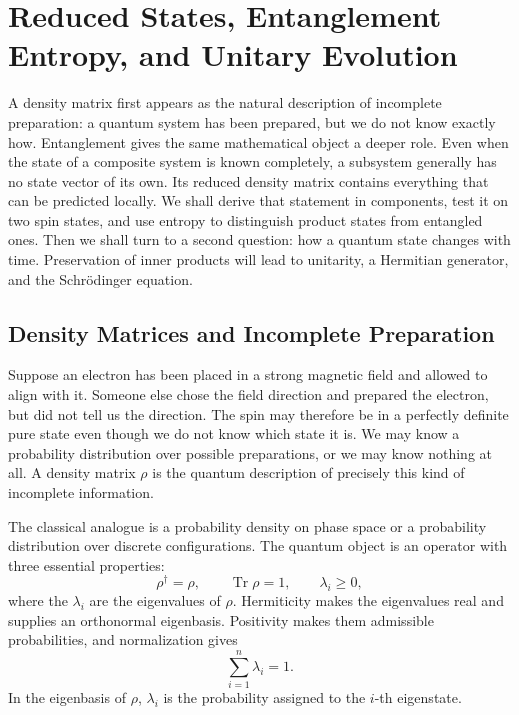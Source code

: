\chapter{Reduced States, Entanglement Entropy, and Unitary Evolution}

A density matrix first appears as the natural description of incomplete preparation: a quantum system has been prepared, but we do not know exactly how. Entanglement gives the same mathematical object a deeper role. Even when the state of a composite system is known completely, a subsystem generally has no state vector of its own. Its reduced density matrix contains everything that can be predicted locally. We shall derive that statement in components, test it on two spin states, and use entropy to distinguish product states from entangled ones. Then we shall turn to a second question: how a quantum state changes with time. Preservation of inner products will lead to unitarity, a Hermitian generator, and the Schr\"odinger equation.

\section{Density Matrices and Incomplete Preparation}

Suppose an electron has been placed in a strong magnetic field and allowed to align with it. Someone else chose the field direction and prepared the electron, but did not tell us the direction. The spin may therefore be in a perfectly definite pure state even though we do not know which state it is. We may know a probability distribution over possible preparations, or we may know nothing at all. A density matrix \(\rho\) is the quantum description of precisely this kind of incomplete information.

The classical analogue is a probability density on phase space or a probability distribution over discrete configurations. The quantum object is an operator with three essential properties:
\begin{equation}
\rho^\dagger=\rho,
\qquad
\operatorname{Tr}\rho=1,
\qquad
\lambda_i\geq 0,
\end{equation}
where the \(\lambda_i\) are the eigenvalues of \(\rho\). Hermiticity makes the eigenvalues real and supplies an orthonormal eigenbasis. Positivity makes them admissible probabilities, and normalization gives
\begin{equation}
\sum_{i=1}^{n}\lambda_i=1.
\end{equation}
In the eigenbasis of \(\rho\), \(\lambda_i\) is the probability assigned to the \(i\)-th eigenstate.

